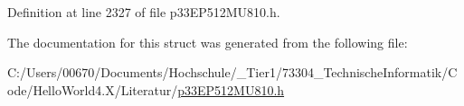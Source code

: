 Definition at line 2327 of file p33\+E\+P512\+M\+U810.\+h.



The documentation for this struct was generated from the following file\+:\begin{DoxyCompactItemize}
\item 
C\+:/\+Users/00670/\+Documents/\+Hochschule/\+\_\+\+Tier1/73304\+\_\+\+Technische\+Informatik/\+Code/\+Hello\+World4.\+X/\+Literatur/\hyperlink{p33_e_p512_m_u810_8h}{p33\+E\+P512\+M\+U810.\+h}\end{DoxyCompactItemize}
